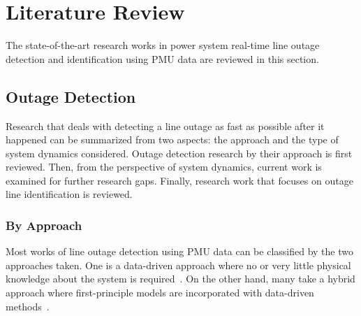 \chapter{Literature Review}
\label{ch:literature}
\vspace{2em}

The state-of-the-art research works in power system real-time line outage detection and identification using PMU data are reviewed in this section. 

\section{Outage Detection} %
\label{sub:outage_detection}

Research that deals with detecting a line outage as fast as possible after it happened can be summarized from two aspects: the approach and the type of system dynamics considered. Outage detection research by their approach is first reviewed. Then, from the perspective of system dynamics, current work is examined for further research gaps. Finally, research work that focuses on outage line identification is reviewed.

\subsection{By Approach} %
\label{ssub:by_approach}

Most works of line outage detection using PMU data can be classified by the two approaches taken. One is a data-driven approach where no or very little physical knowledge about the system is required~\cite{Xie2014, Rafferty2016, Hosur2019}. On the other hand, many take a hybrid approach where first-principle models are incorporated with data-driven methods~\cite{Jamei2016, Jamei2017a, ardakanian2017event, Ardakanian2019a, Tate2008, tate2009double, dai2020line,Chen2016, Rovatsos2017}. 

